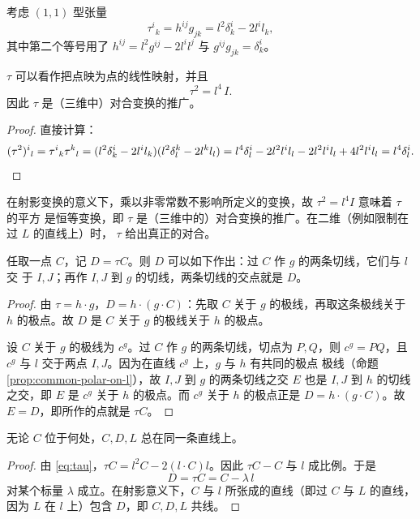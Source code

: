考虑 $(1,1)$ 型张量
\begin{equation}
\label{eq:tau}
\tau^i{}_k=h^{ij}g_{jk}=l^2\delta^i_k-2l^il_k ,
\end{equation}
其中第二个等号用了 $h^{ij}=l^2g^{ij}-2l^il^j$ 与 $g^{ij}g_{jk}=\delta^i_k$。

\begin{proposition}
\label{prop:tau}
$\tau$ 可以看作把点映为点的线性映射，并且
\[
\tau^2=l^4\,I .
\]
因此 $\tau$ 是（三维中）对合变换的推广。
\end{proposition}

\begin{proof}
直接计算：
\[
(\tau^2)^i{}_l=\tau^i{}_k\tau^k{}_l
=(l^2\delta^i_k-2l^il_k)(l^2\delta^k_l-2l^kl_l)
=l^4\delta^i_l-2l^2l^il_l-2l^2l^il_l+4l^2l^il_l=l^4\delta^i_l . \qedhere
\]
\end{proof}

\begin{remark}
在射影变换的意义下，乘以非零常数不影响所定义的变换，故 $\tau^2=l^4I$ 意味着 $\tau$ 的平方
是恒等变换，即 $\tau$ 是（三维中的）对合变换的推广。在二维（例如限制在过 $L$ 的直线上）时，
$\tau$ 给出真正的对合。
\end{remark}

\begin{proposition}
\label{prop:tau-construction}
任取一点 $C$，记 $D=\tau C$。则 $D$ 可以如下作出：过 $C$ 作 $g$ 的两条切线，它们与 $l$ 交
于 $I,J$；再作 $I,J$ 到 $g$ 的切线，两条切线的交点就是 $D$。
\end{proposition}

\begin{proof}
由 $\tau=h\cdot g$，$D=h\cdot(g\cdot C)$：先取 $C$ 关于 $g$ 的极线，再取这条极线关于 $h$
的极点。故 $D$ 是 $C$ 关于 $g$ 的极线关于 $h$ 的极点。

设 $C$ 关于 $g$ 的极线为 $c^g$。过 $C$ 作 $g$ 的两条切线，切点为 $P,Q$，则
$c^g=PQ$，且 $c^g$ 与 $l$ 交于两点 $I,J$。因为在直线 $c^g$ 上，$g$ 与 $h$ 有共同的极点
极线（命题 \ref{prop:common-polar-on-l}），故 $I,J$ 到 $g$ 的两条切线之交 $E$ 也是 $I,J$ 到
$h$ 的切线之交，即 $E$ 是 $c^g$ 关于 $h$ 的极点。而 $c^g$ 关于 $h$ 的极点正是
$D=h\cdot(g\cdot C)$。故 $E=D$，即所作的点就是 $\tau C$。
\end{proof}

\begin{proposition}
\label{prop:tau-line}
无论 $C$ 位于何处，$C,D,L$ 总在同一条直线上。
\end{proposition}

\begin{proof}
由 \eqref{eq:tau}，$\tau C=l^2C-2(l\cdot C)l$。因此 $\tau C-C$ 与 $l$ 成比例。于是
\[
D=\tau C=C-\lambda\,l
\]
对某个标量 $\lambda$ 成立。在射影意义下，$C$ 与 $l$ 所张成的直线（即过 $C$ 与 $L$ 的直线，
因为 $L$ 在 $l$ 上）包含 $D$，即 $C,D,L$ 共线。
\end{proof}

